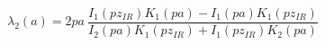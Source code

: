 \begin{equation}
\lambda_2(a)=2 p a~ \frac {I_1(p z_{IR})K_1(p a)-I_1(p a)K_1(p
z_{IR})} {I_2(p a) K_1(p z_{IR})+I_1(p z_{IR})K_2(p a)}
\label{2pirs}
\end{equation}

